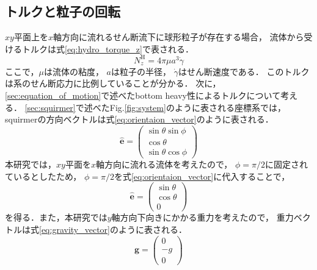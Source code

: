 \subsection{トルクと粒子の回転}
\label{sec:rotation}
$xy$平面上を$x$軸方向に流れるせん断流下に球形粒子が存在する場合，
流体から受けるトルクは式\eqref{eq:hydro_torque_z}で表される\cite{hidro_torque}．
    \begin{equation}
        N^\mathrm{H}_z = 4 \pi \mu a^3 \dot{\gamma}
        \label{eq:hydro_torque_z}
    \end{equation}
ここで，$\mu$は流体の粘度，
$a$は粒子の半径，
$\dot{\gamma}$はせん断速度である．
このトルクは系のせん断応力に比例していることが分かる．
次に，\ref{sec:equation_of_motion}で述べたbottom heavy性によるトルクについて考える．
\ref{sec:squirmer}で述べたFig.\ref{fig:system}のように表される座標系では，
squirmerの方向ベクトルは式\eqref{eq:orientaion_vector}のように表される．
    \begin{equation}
        \boldsymbol{\hat{e}} =
        \left(
            \begin{array}{c}
                \sin{\theta} \sin{\phi} \\
                \cos{\theta} \\
                \sin{\theta} \cos{\phi}
            \end{array}
        \right)
        \label{eq:orientaion_vector}
    \end{equation}
本研究では，$xy$平面を$x$軸方向に流れる流体を考えたので，
$\phi = \pi / 2$に固定されているとしたため，
$\phi = \pi / 2$を式\eqref{eq:orientaion_vector}に代入することで，
    \begin{equation}
        \boldsymbol{\hat{e}} =
        \left(
            \begin{array}{c}
                \sin{\theta} \\
                \cos{\theta} \\
                0
            \end{array}
        \right)
        \label{eq:orientaion_vector2}
    \end{equation}
を得る．また，本研究では$y$軸方向下向きにかかる重力を考えたので，
重力ベクトルは式\eqref{eq:gravity_vector}のように表される．
    \begin{equation}
        \boldsymbol{g} =
        \left(
            \begin{array}{c}
                0 \\
                -g \\
                0
            \end{array}
        \right)
        \label{eq:gravity_vector}
    \end{equation}
